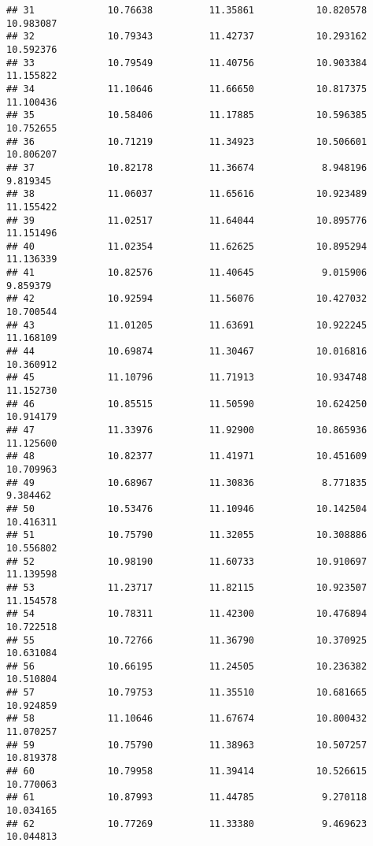 \documentclass[
]{article}
\begin{document}
\begin{verbatim}
## 31             10.76638          11.35861           10.820578         10.983087
## 32             10.79343          11.42737           10.293162         10.592376
## 33             10.79549          11.40756           10.903384         11.155822
## 34             11.10646          11.66650           10.817375         11.100436
## 35             10.58406          11.17885           10.596385         10.752655
## 36             10.71219          11.34923           10.506601         10.806207
## 37             10.82178          11.36674            8.948196          9.819345
## 38             11.06037          11.65616           10.923489         11.155422
## 39             11.02517          11.64044           10.895776         11.151496
## 40             11.02354          11.62625           10.895294         11.136339
## 41             10.82576          11.40645            9.015906          9.859379
## 42             10.92594          11.56076           10.427032         10.700544
## 43             11.01205          11.63691           10.922245         11.168109
## 44             10.69874          11.30467           10.016816         10.360912
## 45             11.10796          11.71913           10.934748         11.152730
## 46             10.85515          11.50590           10.624250         10.914179
## 47             11.33976          11.92900           10.865936         11.125600
## 48             10.82377          11.41971           10.451609         10.709963
## 49             10.68967          11.30836            8.771835          9.384462
## 50             10.53476          11.10946           10.142504         10.416311
## 51             10.75790          11.32055           10.308886         10.556802
## 52             10.98190          11.60733           10.910697         11.139598
## 53             11.23717          11.82115           10.923507         11.154578
## 54             10.78311          11.42300           10.476894         10.722518
## 55             10.72766          11.36790           10.370925         10.631084
## 56             10.66195          11.24505           10.236382         10.510804
## 57             10.79753          11.35510           10.681665         10.924859
## 58             11.10646          11.67674           10.800432         11.070257
## 59             10.75790          11.38963           10.507257         10.819378
## 60             10.79958          11.39414           10.526615         10.770063
## 61             10.87993          11.44785            9.270118         10.034165
## 62             10.77269          11.33380            9.469623         10.044813

\end{verbatim}
\end{document}
